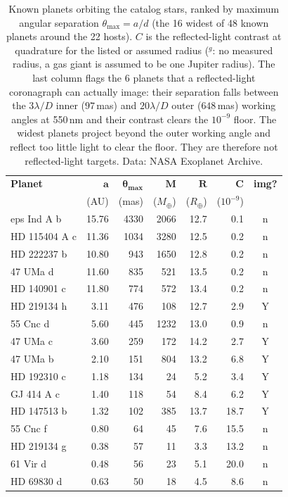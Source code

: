 \begin{table}[tp]\centering\small\setlength{\tabcolsep}{5pt}
\begin{tabular}{l r r r r r c}
\toprule
\textbf{Planet} & $\boldsymbol{a}$ & $\boldsymbol{\theta_{\max}}$ & $\boldsymbol{M}$ & $\boldsymbol{R}$ & $\boldsymbol{C}$ & \textbf{img?} \\
 & (AU) & (mas) & ($M_\oplus$) & ($R_\oplus$) & ($10^{-9}$) & \\
\midrule
eps Ind A b & 15.76 & 4330 & 2066 & 12.7 & 0.1 & n \\
HD 115404 A c & 11.36 & 1034 & 3280 & 12.5 & 0.2 & n \\
HD 222237 b & 10.80 & 943 & 1650 & 12.8 & 0.2 & n \\
47 UMa d & 11.60 & 835 & 521 & 13.5 & 0.2 & n \\
HD 140901 c & 11.80 & 774 & 572 & 13.4 & 0.2 & n \\
HD 219134 h & 3.11 & 476 & 108 & 12.7 & 2.9 & Y \\
55 Cnc d & 5.60 & 445 & 1232 & 13.0 & 0.9 & n \\
47 UMa c & 3.60 & 259 & 172 & 14.2 & 2.7 & Y \\
47 UMa b & 2.10 & 151 & 804 & 13.2 & 6.8 & Y \\
HD 192310 c & 1.18 & 134 & 24 & 5.2 & 3.4 & Y \\
GJ 414 A c & 1.40 & 118 & 54 & 8.4 & 6.2 & Y \\
HD 147513 b & 1.32 & 102 & 385 & 13.7 & 18.7 & Y \\
55 Cnc f & 0.80 & 64 & 45 & 7.6 & 15.5 & n \\
HD 219134 g & 0.38 & 57 & 11 & 3.3 & 13.2 & n \\
61 Vir d & 0.48 & 56 & 23 & 5.1 & 20.0 & n \\
HD 69830 d & 0.63 & 50 & 18 & 4.5 & 8.6 & n \\
\bottomrule
\end{tabular}
\caption{Known planets orbiting the catalog stars, ranked by maximum angular separation $\theta_{\max}=a/d$ (the 16 widest of 48 known planets around the 22 hosts). $C$ is the reflected-light contrast at quadrature for the listed or assumed radius ($^{g}$: no measured radius, a gas giant is assumed to be one Jupiter radius). The last column flags the 6 planets that a reflected-light coronagraph can actually image: their separation falls between the $3\lambda/D$ inner ($97$\,mas) and $20\lambda/D$ outer ($648$\,mas) working angles at 550\,nm and their contrast clears the $10^{-9}$ floor. The widest planets project beyond the outer working angle and reflect too little light to clear the floor. They are therefore not reflected-light targets. Data: NASA Exoplanet Archive.}\label{tab:firstlight}
\end{table}
